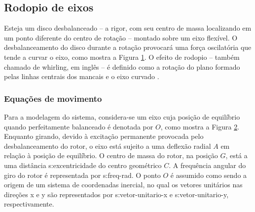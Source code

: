 \documentclass[12pt,openright,oneside,a4paper,
	chapter=TITLE,section=TITLE,
	english,brazil]{abntex2}
\begin{document}
	\subsection{Rodopio de eixos}
	Esteja um disco desbalanceado -- a rigor, com seu centro de massa localizando em um ponto diferente do centro de rotação -- montado sobre um eixo flexível. O desbalanceamento do disco durante a rotação provocará uma força oscilatória que tende a curvar o eixo, como mostra a Figura \ref{fig:whirl-eixo}. O efeito de rodopio -- também chamado de \foreignlanguage{english}{whirling}, em inglês -- é definido como a rotação do plano formado pelas linhas centrais dos mancais e o eixo curvado \cite{rao:2008}.
	\begin{figure}[b]
		\label{fig:whirl-eixo}
	\end{figure}

	\subsubsection{Equações de movimento}
	Para a modelagem do sistema, considera-se um eixo cuja posição de equilíbrio quando perfeitamente balanceado é denotada por $\!\mathit{O}$, como mostra a Figura \ref{fig:rotor-excentrico}. Enquanto girando, devido à excitação permanente provocada pelo desbalanceamento do rotor, o eixo está sujeito a uma deflexão radial $\!\mathit{A}$ em relação à posição de equilíbrio. O centro de massa do rotor, na posição $\!\mathit{G}$, está a uma distância \gls{s:excentricidade} do centro geométrico $\!\mathit{C}$. A frequência angular do giro do rotor é representada por \gls{s:freq-rad}. O ponto $\!\mathit{O}$ é assumido como sendo a origem de um sistema de coordenadas inercial, no qual os vetores unitários nas direções x e y são representados por \gls{s:vetor-unitario-x} e \gls{s:vetor-unitario-y}, respectivamente.
	\begin{figure}[h]
		\label{fig:rotor-excentrico}
	\end{figure}
	
\end{document}
